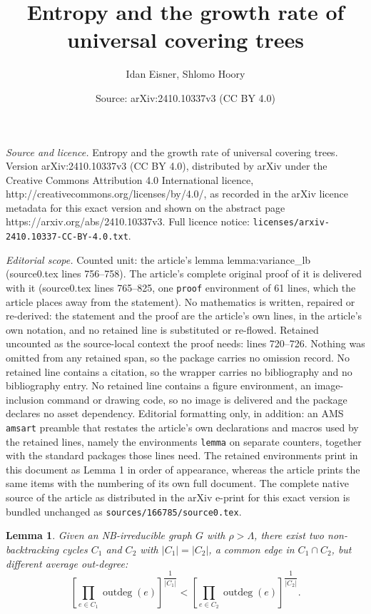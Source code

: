 \documentclass[10pt,a4paper]{amsart}
\title{Entropy and the growth rate of universal covering trees}
\author{Idan Eisner, Shlomo Hoory}
\date{Source: arXiv:2410.10337v3 (CC BY 4.0)}
\newtheorem{lemma}{Lemma}
\DeclareMathOperator{\outdeg}{outdeg}
\begin{document}
\maketitle

\noindent\emph{Source and licence.} Entropy and the growth rate of universal covering trees. Version arXiv:2410.10337v3 (CC BY 4.0), distributed by arXiv under the Creative Commons Attribution 4.0 International licence, http://creativecommons.org/licenses/by/4.0/, as recorded in the arXiv licence metadata for this exact version and shown on the abstract page https://arxiv.org/abs/2410.10337v3. Full licence notice: \texttt{licenses/arxiv-2410.10337-CC-BY-4.0.txt}.\par\smallskip

\noindent\textit{Editorial scope.} Counted unit: the article's lemma lemma:variance\_lb (source0.tex lines 756--758). The article's complete original proof of it is delivered with it (source0.tex lines 765--825, one \texttt{proof} environment of 61 lines, which the article places away from the statement). No mathematics is written, repaired or re-derived: the statement and the proof are the article's own lines, in the article's own notation, and no retained line is substituted or re-flowed.  Retained uncounted as the source-local context the proof needs: lines 720--726.  Nothing was omitted from any retained span, so the package carries no omission record.  No retained line contains a citation, so the wrapper carries no bibliography and no bibliography entry.  No retained line contains a figure environment, an image-inclusion command or drawing code, so no image is delivered and the package declares no asset dependency.  Editorial formatting only, in addition: an AMS \texttt{amsart} preamble that restates the article's own declarations and macros used by the retained lines, namely the environments \texttt{lemma} on separate counters, together with the standard packages those lines need.  The retained environments print in this document as Lemma 1 in order of appearance, whereas the article prints the same items with the numbering of its own full document.  The complete native source of the article as distributed in the arXiv e-print for this exact version is bundled unchanged as \texttt{sources/166785/source0.tex}.
\begin{lemma}\label{lemma:two_cycles_variance}
    Given an NB-irreducible graph $G$ with $\rho > \Lambda$, there exist two non-backtracking cycles $C_1$ and $C_2$ with $|C_1| = |C_2|$, 
    a common edge in $C_1 \cap C_2$, but different average out-degree:
    \begin{equation*}
        \left[ \prod_{e \in C_1} \outdeg(e) \right]^{\dfrac{1}{|C_1|}} < \left[ \prod_{e \in C_2} \outdeg(e) \right]^{\dfrac{1}{|C_2|}}.
    \end{equation*}
\end{lemma}
\end{document}
